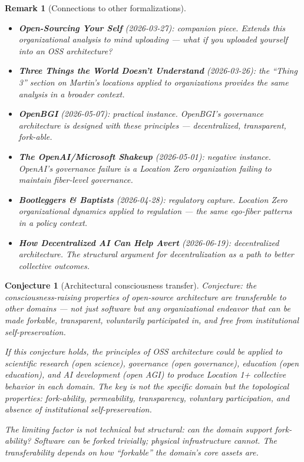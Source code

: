 \documentclass[11pt,a4paper]{article}
\newtheorem{remark}[definition]{Remark}
\newtheorem{conjecture}[definition]{Conjecture}
\begin{document}
\begin{remark}[Connections to other formalizations]
\begin{itemize}
\item \textbf{Open-Sourcing Your Self} (2026-03-27): companion piece.
  Extends this organizational analysis to mind uploading --- what if
  you uploaded yourself into an OSS architecture?
\item \textbf{Three Things the World Doesn't Understand} (2026-03-26):
  the ``Thing 3'' section on Martin's locations applied to organizations
  provides the same analysis in a broader context.
\item \textbf{OpenBGI} (2026-05-07): practical instance. OpenBGI's
  governance architecture is designed with these principles ---
  decentralized, transparent, fork-able.
\item \textbf{The OpenAI/Microsoft Shakeup} (2026-05-01): negative
  instance. OpenAI's governance failure is a Location Zero organization
  failing to maintain fiber-level governance.
\item \textbf{Bootleggers \& Baptists} (2026-04-28): regulatory capture.
  Location Zero organizational dynamics applied to regulation ---
  the same ego-fiber patterns in a policy context.
\item \textbf{How Decentralized AI Can Help Avert} (2026-06-19):
  decentralized architecture. The structural argument for
  decentralization as a path to better collective outcomes.
\end{itemize}
\end{remark}

\begin{conjecture}[Architectural consciousness transfer]
Conjecture: the consciousness-raising properties of open-source
architecture are transferable to other domains --- not just software
but any organizational endeavor that can be made forkable, transparent,
voluntarily participated in, and free from institutional self-preservation.

If this conjecture holds, the principles of OSS architecture could be
applied to scientific research (open science), governance (open governance),
education (open education), and AI development (open AGI) to produce
Location 1+ collective behavior in each domain. The key is not the
specific domain but the topological properties: fork-ability, permeability,
transparency, voluntary participation, and absence of institutional
self-preservation.

The limiting factor is not technical but structural: can the domain
support fork-ability? Software can be forked trivially; physical
infrastructure cannot. The transferability depends on how ``forkable''
the domain's core assets are.
\end{conjecture}
\end{document}
